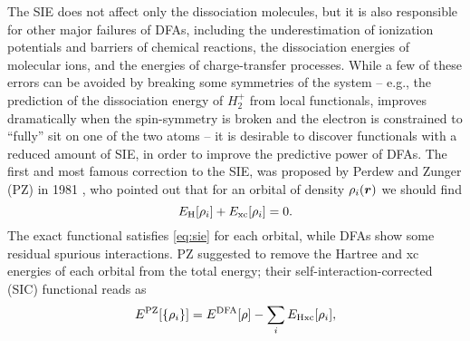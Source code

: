 The SIE does not affect only the dissociation molecules, but it is also responsible for other major failures of DFAs, including the underestimation of ionization potentials and barriers of chemical reactions, the dissociation energies of molecular ions, and the energies of charge-transfer processes. While a few of these errors can be avoided by breaking some symmetries of the system -- e.g., the prediction of the dissociation energy of $H_2^+$ from local functionals, improves dramatically when the spin-symmetry is broken and the electron is constrained to ``fully'' sit on one of the two atoms -- it is desirable to discover functionals with a reduced amount of SIE, in order to improve the predictive power of DFAs. The first and most famous correction to the SIE, was proposed by Perdew and Zunger (PZ) in 1981 \cite{perdew_self-interaction_1981}, who pointed out that for an orbital of density $\rho_i({\bm r})$ we should find
%
\begin{equation}
    E_{\rm H}[\rho_i] + E_{\rm xc}[\rho_i] = 0 .
    \label{eq:sie}
\end{equation}
%
The exact functional satisfies \cref{eq:sie} for each orbital, while DFAs show some residual spurious interactions. PZ suggested to remove the Hartree and xc energies of each orbital from the total energy; their self-interaction-corrected (SIC) functional reads as
%
\begin{equation}
    E^{\rm PZ}[\{ \rho_i \}] = E^{\rm DFA}[\rho] - \sum_i E_{\rm Hxc}[\rho_i] ,
    \label{eq:pz-functional}
\end{equation}
%
